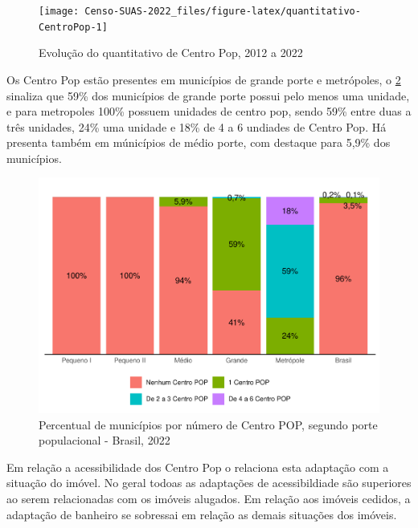 \documentclass[
  brazilian]{report}
\begin{document}
\begin{figure}
\texttt{[image: Censo-SUAS-2022\_files/figure-latex/quantitativo-CentroPop-1]} \caption[Evolução do quantitativo de Centro Pop, 2012 a 2022]{Evolução do quantitativo de Centro Pop, 2012 a 2022}\label{fig:quantitativo-CentroPop}
\end{figure}

Os Centro Pop estão presentes em municípios de grande porte e
metrópoles, o \cref{fig:cpop-porte} sinaliza que 59\% dos municípios de
grande porte possui pelo menos uma unidade, e para metropoles 100\%
possuem unidades de centro pop, sendo 59\% entre duas a três unidades,
24\% uma unidade e 18\% de 4 a 6 undiades de Centro Pop. Há presenta
também em múnicípios de médio porte, com destaque para 5,9\% dos
municípios.

\begin{figure}
\includegraphics{Censo-SUAS-2022_files/figure-latex/cpop-porte-1} \caption[Percentual de municípios por número de Centro POP, segundo porte populacional - Brasil, 2022]{Percentual de municípios por número de Centro POP, segundo porte populacional - Brasil, 2022}\label{fig:cpop-porte}
\end{figure}

Em relação a acessibilidade dos Centro Pop o
 relaciona esta adaptação com a
situação do imóvel. No geral todoas as adaptações de acessibildiade são
superiores ao serem relacionadas com os imóveis alugados. Em relação aos
imóveis cedidos, a adaptação de banheiro se sobressai em relação as
demais situações dos imóveis.
\end{document}
